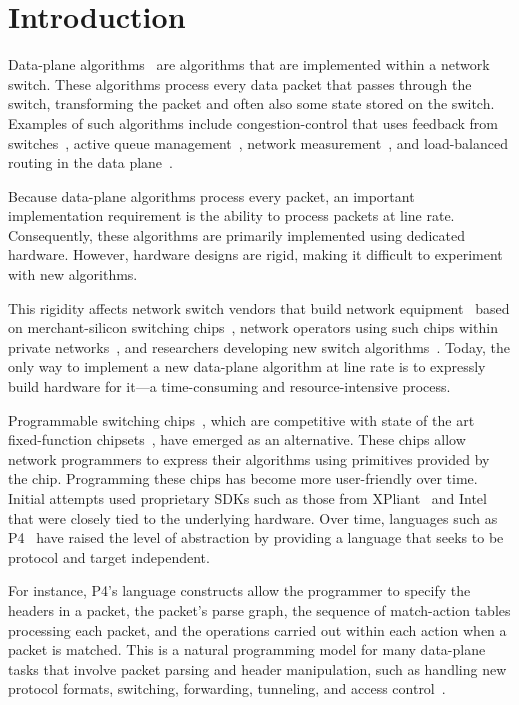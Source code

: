 \section{Introduction}
\label{s:intro}

Data-plane algorithms~\cite{cestan} are algorithms that are implemented within
a network switch. These algorithms process every data packet that passes
through the switch, transforming the packet and often also some state stored on
the switch.  Examples of such algorithms include congestion-control that uses
feedback from switches~\cite{xcp, rcp, pdq, dctcp}, active queue
management~\cite{codel}, network measurement~\cite{opensketch, bitmap_george,
elephant_george}, and load-balanced routing in the data plane~\cite{conga}.

Because data-plane algorithms process every packet, an important implementation
requirement is the ability to process packets at line rate.  Consequently,
these algorithms are primarily implemented using dedicated hardware. However,
hardware designs are rigid, making it difficult to experiment with new
algorithms.

This rigidity affects network switch vendors that build network
equipment~\cite{cisco_nexus, dell_force10, arista_7050} based on
merchant-silicon switching chips~\cite{trident, tomahawk, mellanox}, network
operators using such chips within private networks~\cite{google,facebook,vl2},
and researchers developing new switch algorithms~\cite{xcp, codel, d3, detail,
pdq}. Today, the only way to implement a new data-plane algorithm at line rate
is to expressly build hardware for it---a time-consuming and resource-intensive
process.

Programmable switching chips~\cite{flexpipe, xpliant, rmt}, which are
competitive with state of the art fixed-function chipsets~\cite{trident,
tomahawk, mellanox}, have emerged as an alternative.  These chips allow network
programmers to express their algorithms using primitives provided by the chip.
Programming these chips has become more user-friendly over time. Initial
attempts used proprietary SDKs such as those from XPliant~\cite{xpliant_sdk,
xpliant_sdk2} and Intel~\cite{intel_sdk} that were closely tied to the
underlying hardware.  Over time, languages such as P4~\cite{p4, p4spec} have
raised the level of abstraction by providing a language that seeks to be
protocol and target independent.

For instance, P4's language constructs allow the programmer to specify the
headers in a packet, the packet's parse graph, the sequence of match-action
tables processing each packet, and the operations carried out within each
action when a packet is matched. This is a natural programming model for many
data-plane tasks that involve packet parsing and header manipulation, such as
handling new protocol formats, switching, forwarding, tunneling, and access
control~\cite{dc_p4}.

